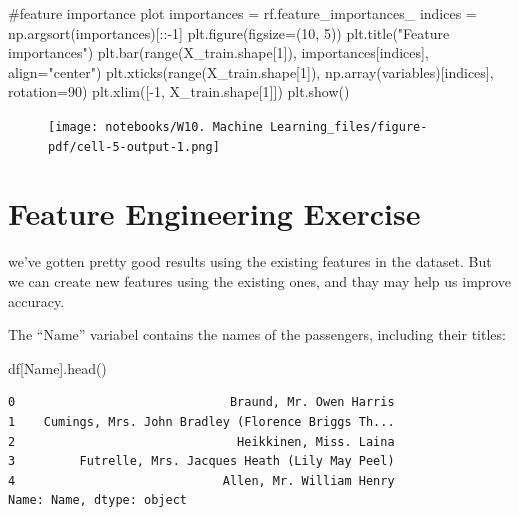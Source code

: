 \documentclass[
  letterpaper,
  DIV=11,
  numbers=noendperiod]{scrreprt}
\newenvironment{Shaded}{\begin{snugshade}}{\end{snugshade}}
\newcommand{\BuiltInTok}[1]{\textcolor[rgb]{0.00,0.23,0.31}{#1}}
\newcommand{\CommentTok}[1]{\textcolor[rgb]{0.37,0.37,0.37}{#1}}
\newcommand{\DecValTok}[1]{\textcolor[rgb]{0.68,0.00,0.00}{#1}}
\newcommand{\NormalTok}[1]{\textcolor[rgb]{0.00,0.23,0.31}{#1}}
\newcommand{\OperatorTok}[1]{\textcolor[rgb]{0.37,0.37,0.37}{#1}}
\newcommand{\StringTok}[1]{\textcolor[rgb]{0.13,0.47,0.30}{#1}}
\begin{document}
\begin{Shaded}
\begin{Highlighting}[]
\CommentTok{\#feature importance plot }
\NormalTok{importances }\OperatorTok{=}\NormalTok{ rf.feature\_importances\_}
\NormalTok{indices }\OperatorTok{=}\NormalTok{ np.argsort(importances)[::}\OperatorTok{{-}}\DecValTok{1}\NormalTok{]}
\NormalTok{plt.figure(figsize}\OperatorTok{=}\NormalTok{(}\DecValTok{10}\NormalTok{, }\DecValTok{5}\NormalTok{))}
\NormalTok{plt.title(}\StringTok{"Feature importances"}\NormalTok{)}
\NormalTok{plt.bar(}\BuiltInTok{range}\NormalTok{(X\_train.shape[}\DecValTok{1}\NormalTok{]), importances[indices], align}\OperatorTok{=}\StringTok{"center"}\NormalTok{)}
\NormalTok{plt.xticks(}\BuiltInTok{range}\NormalTok{(X\_train.shape[}\DecValTok{1}\NormalTok{]), np.array(variables)[indices], rotation}\OperatorTok{=}\DecValTok{90}\NormalTok{)}
\NormalTok{plt.xlim([}\OperatorTok{{-}}\DecValTok{1}\NormalTok{, X\_train.shape[}\DecValTok{1}\NormalTok{]])}
\NormalTok{plt.show()}
\end{Highlighting}
\end{Shaded}

\begin{figure}[H]

{\centering \texttt{[image: notebooks/W10. Machine Learning\_files/figure-pdf/cell-5-output-1.png]}

}

\end{figure}

\hypertarget{feature-engineering-exercise}{%
\section{Feature Engineering
Exercise}\label{feature-engineering-exercise}}

we've gotten pretty good results using the existing features in the
dataset. But we can create new features using the existing ones, and
thay may help us improve accuracy.

The ``Name'' variabel contains the names of the passengers, including
their titles:

\begin{Shaded}
\begin{Highlighting}[]
\NormalTok{df[}\StringTok{\textquotesingle{}Name\textquotesingle{}}\NormalTok{].head()}
\end{Highlighting}
\end{Shaded}

\begin{verbatim}
0                              Braund, Mr. Owen Harris
1    Cumings, Mrs. John Bradley (Florence Briggs Th...
2                               Heikkinen, Miss. Laina
3         Futrelle, Mrs. Jacques Heath (Lily May Peel)
4                             Allen, Mr. William Henry
Name: Name, dtype: object
\end{verbatim}
\end{document}
